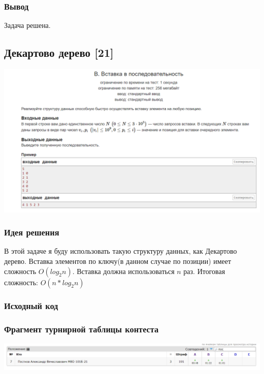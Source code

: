 \subsubsection*{Вывод}
Задача решена.

\vspace{20pt}

\pagebreak

\subsection*{Декартово дерево [21]}
\begin{center}
\includegraphics[width=\textwidth]{statements/22.png}
\end{center}
\subsubsection*{Идея решения}
В этой задаче я буду использовать такую структуру данных, как Декартово дерево. Вставка элементов по ключу(в данном случае по позиции) имеет сложность $O(log_{2} n)$. Вставка должна использоваться $n$ раз. Итоговая сложность: $O(n*log_{2} n)$
\subsubsection*{Исходный код}


\subsubsection*{Фрагмент турнирной таблицы контеста}
\begin{center}
\includegraphics[width=\textwidth]{standings/22.png}\newline\noindent
\end{center}

